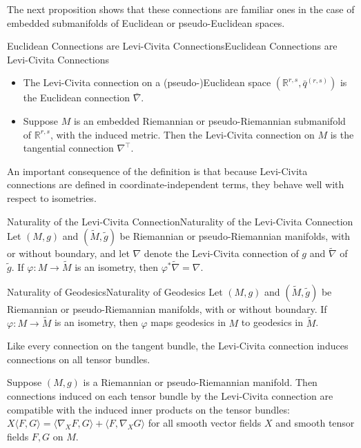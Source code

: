 \documentclass[../main.tex]{subfiles}
\begin{document}
The next proposition shows that these connections are familiar ones in the case of embedded submanifolds of Euclidean or pseudo-Euclidean spaces.
\begin{proposition}{Euclidean Connections are Levi-Civita Connections}{Euclidean Connections are Levi-Civita Connections}
	\begin{itemize}
		\item The Levi-Civita connection on a (pseudo-)Euclidean space $(\mathbb{R}^{r,s}, \bar{q}^{(r,s)})$ is the Euclidean connection $\bar{\nabla}$.
		\item Suppose $M$ is an embedded Riemannian or pseudo-Riemannian submanifold of $\mathbb{R}^{r,s}$, with the induced metric. Then the Levi-Civita connection on $M$ is the tangential connection $\nabla^{\top}$.
	\end{itemize}
\end{proposition}

An important consequence of the definition is that because Levi-Civita connections are defined in coordinate-independent terms, they behave well with respect to isometries.

\begin{proposition}{Naturality of the Levi-Civita Connection}{Naturality of the Levi-Civita Connection}
	Let $(M, g)$ and $(\tilde{M}, \tilde{g})$ be Riemannian or pseudo-Riemannian manifolds, with or without boundary, and let $\nabla$ denote the Levi-Civita connection of $g$ and $\tilde{\nabla}$ of $\tilde{g}$. If $\varphi: M \to \tilde{M}$ is an isometry, then $\varphi^*\tilde{\nabla} = \nabla$.
\end{proposition}

\begin{proposition}{Naturality of Geodesics}{Naturality of Geodesics}
	Let $(M, g)$ and $(\tilde{M}, \tilde{g})$ be Riemannian or pseudo-Riemannian manifolds, with or without boundary. If $\varphi: M \to \tilde{M}$ is an isometry, then $\varphi$ maps geodesics in $M$ to geodesics in $\tilde{M}$.
\end{proposition}

Like every connection on the tangent bundle, the Levi-Civita connection induces connections on all tensor bundles.

\begin{proposition}{}{}
	Suppose $(M, g)$ is a Riemannian or pseudo-Riemannian manifold. Then connections induced on each tensor bundle by the Levi-Civita connection are compatible with the induced inner products on the tensor bundles: $X \langle F, G \rangle = \langle \nabla_X F, G \rangle + \langle F, \nabla_X G \rangle$ for all smooth vector fields $X$ and smooth tensor fields $F, G$ on $M$.
\end{proposition}
\end{document}
